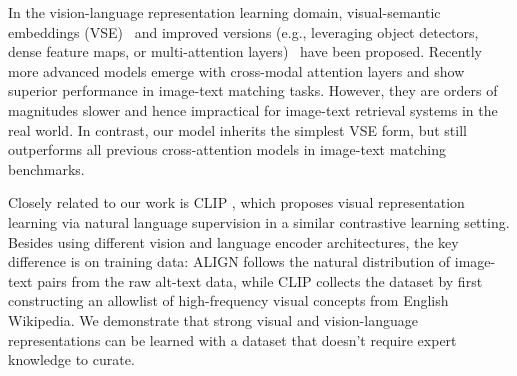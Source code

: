 \documentclass{article}
\begin{document}


In the vision-language representation learning domain, visual-semantic embeddings (VSE)~\citep{frome:devise,faghri:vse++} and improved versions (e.g., leveraging object detectors, dense feature maps, or multi-attention layers)~\citep{socher-etal-2014-grounded,karpathy:2014,kiros:2014,nam:dan,li:vsrn,teran,chen:vsepooling} have been proposed.
Recently more advanced models emerge with cross-modal attention layers \cite{liu:mia, lu:vilbert, chen:uniter, pixel-bert} and show superior performance in image-text matching tasks. However, they are orders of magnitudes slower and hence impractical for image-text retrieval systems in the real world. In contrast, our model inherits the simplest VSE form, but still outperforms all previous cross-attention models in image-text matching benchmarks.

Closely related to our work is CLIP \cite{radford:clip}, which proposes visual representation learning via natural language supervision in a similar contrastive learning setting. Besides using different vision and language encoder architectures, the key difference is on training data: ALIGN follows the natural distribution of image-text pairs from the raw alt-text data, while CLIP collects the dataset by first constructing an allowlist of high-frequency visual concepts from English Wikipedia. We demonstrate that strong visual and vision-language representations can be learned with a dataset that doesn't require expert knowledge to curate.
\end{document}
